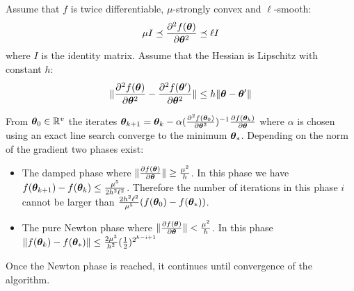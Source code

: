 \begin{proposition}
  \label{eq:conv:newton}
  Assume that $f$ is twice differentiable, $\mu$-strongly convex and $\ell$-smooth:
  \begin{equation}
    \mu I \preceq \partialfrac{\thetab^2}{^2 f(\thetab)} \preceq \ell I
  \end{equation}
  where $I$ is the identity matrix.
  Assume that the Hessian is Lipschitz with constant $h$:
  \begin{equation}
  \| \partialfrac{\thetab^2}{^2 f(\thetab)} - \partialfrac{\thetab^2}{^2 f(\thetab')} \| \leq h \| \thetab
  - \thetab' \|
 \end{equation}

  From $\thetab_0 \in \RR^v$  the iterates
  $\thetab_{k+1} = \thetab_k -\alpha (\partialfrac{\thetab^2}{^2 f(\thetab_0)})^{-1}
  \partialfrac{\thetab}{f(\thetab_k)}$ where $\alpha$ is chosen using an exact line
  search converge to the
  minimum $\thetab_*$.
  Depending on the norm of the gradient two phases exist:
  \begin{itemize}
  \item The damped phase where $\| \partialfrac{\thetab}{f(\thetab)} \| \geq \frac{\mu^2}{h}$.
    In this phase we have $f(\thetab_{k+1}) - f(\thetab_k) \leq \frac{\mu^5}{2h^2 \ell^2}$.
    Therefore the number of iterations in this phase $i$ cannot be larger than
    $\frac{2 h^2 \ell^2}{\mu^5}(f(\thetab_0) - f(\thetab_*))$.
  \item The pure Newton phase where $\| \partialfrac{\thetab}{f(\thetab)} \| < \frac{\mu^2}{h}$.
      In this phase $\|f(\thetab_{k}) - f(\thetab_*)\| \leq \frac{2 \mu^3}{h^2}
      (\frac12)^{2^{k -i +1}}$
 \end{itemize}
 Once the Newton phase is reached, it continues until convergence of the algorithm.
\end{proposition}
